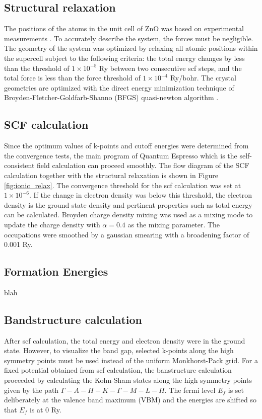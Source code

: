     \subsection{Structural relaxation}
    The positions of the atoms in the unit cell of ZnO was based on experimental measurements \citep{Sabine1969}.  To accurately describe the system, the forces must be negligible. The geometry of the system was optimized by relaxing all atomic positions within the supercell subject to the following criteria: the total energy changes by less than the threshold of $1 \times 10^{-5}$ Ry between two consecutive scf steps, and the total force is less than the force threshold of $1 \times 10^{-4}$ Ry/bohr. The crystal  geometries are optimized with the direct energy minimization technique of Broyden-Fletcher-Goldfarb-Shanno (BFGS) quasi-newton algorithm \citep{Broyden1970,Fletcher1970,Goldfarb1970,Shanno1970}.

    \subsection{SCF calculation}
        Since the optimum values of k-points and cutoff energies were determined from the convergence tests, the main program of Quantum Espresso which is the self-consistent field calculation can proceed smoothly. The flow diagram of the SCF calculation together with the structural relaxation is shown in Figure \ref{fig:ionic_relax}. The convergence threshold for the scf calculation was set at $1 \times 10^{-6}$. If the change in electron density was below this threshold, the electron density is the ground state density and pertinent properties such as total energy can be calculated. Broyden charge density mixing \citep{Broyden1965} was used as a mixing mode to update the charge density with  $\alpha = 0.4$ as the mixing parameter.   The occupations were smoothed by a gaussian smearing with a broadening factor of 0.001 Ry. 

        \subsection{Formation Energies}
    blah
    
        \subsection{Bandstructure calculation}
        After scf calculation, the total energy and electron density were in the ground state. However, to visualize the band gap, selected k-points along the high symmetry points must be used instead of the uniform Monkhorst-Pack grid. For a fixed potential obtained from scf calculation, the banstructure calculation proceeded by calculating the Kohn-Sham states along the high symmetry points given by the path $\Gamma-A-H-K-\Gamma-M-L-H$. The fermi level $E_f$ is set deliberately at the valence band maximum (VBM) and the energies are shifted so that $E_f$ is at  0 Ry. 

